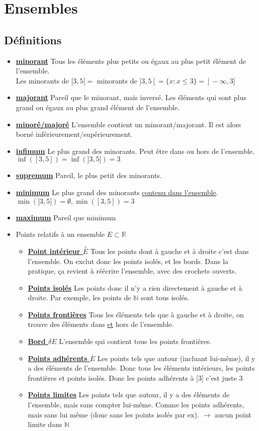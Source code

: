 \documentclass[12pt,a4paper]{article}
\newcommand{\evid}[1]{\textbf{\underline{#1}}}
\newcommand{\R}{\ensuremath{\mathbb{R}} }
\newcommand{\N}{\ensuremath{\mathbb{N}} }
\begin{document}
\section{Ensembles}
\subsection{Définitions}
\begin{itemize}
	\item \evid{minorant} Tous les éléments plus petits ou égaux au plus petit élément de l'ensemble.\\
	Les minorants de $[3,5[ =$ minorants de $]3,5[ = \{x : x \leq 3\} = ]-\infty,3]$
	\item \evid{majorant} Pareil que le minorant, mais inversé. Les éléments qui sont plus grand ou égaux au plus grand élément de l'ensemble.
	\item \evid{minoré/majoré} L'ensemble contient un minorant/majorant. Il est alors borné inférieurement/supérieurement.
	\item \evid{infimum} Le plus grand des minorants. Peut être dans ou hors de l'ensemble.\\
	$\inf([3,5]) = \inf(]3,5]) = 3$	
	\item \evid{supremum} Pareil, le plus petit des minorants.
	\item \evid{minimum} Le plus grand des minorants \underline{contenu dans l'ensemble}.\\
	 $\min(]3,5]) = \emptyset, \min([3,5]) = 3$
	\item \evid{maximum} Pareil que minimum
	\item Points relatifs à un ensemble $E \subset \R$
		\begin{itemize}
		\item \evid{Point intérieur $\overset{\circ}{E}$} Tous les points dont à gauche et à droite c'est dans l'ensemble. On exclut donc les points isolés, et les bords. Dans la pratique, ça revient à réécrire l'ensemble, avec des crochets ouverts. 
		\item \evid{Points isolés} Les points donc il n'y a rien directement à gauche et à droite. Par exemple, les points de \N sont tous isolés.
		\item \evid{Points frontières} Tous les éléments tels que à gauche et à droite, on trouve des éléments dans \underline{et} hors de l'ensemble. 
		\item \evid{Bord $\delta E$} L'ensemble qui contient tous les points frontières.
		\item \evid{Points adhérents $\overline{E}$} Les points tels que autour (incluant lui-même), il y a des éléments de l'ensemble. Donc tous les éléments intérieurs, les points frontières et points isolés. Donc les points adhérents à [3] c'est juste 3
		\item \evid{Points limites} Les points tels que autour, il y a des éléments de l'ensemble, mais sans compter lui-même. Comme les points adhérents, mais sans lui même (donc sans les points isolés par ex). $\to$ aucun point limite dans \N
	\end{itemize}
\end{itemize}
\end{document}
